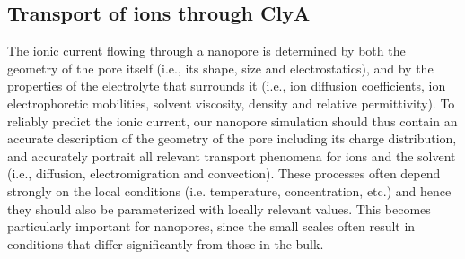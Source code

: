 \documentclass[journal=ancac3, manuscript=article, etalmode=truncate,maxauthors=0]{achemso}
\begin{document}
\subsection{Transport of ions through ClyA}
The ionic current flowing through a nanopore is determined by both the geometry of the pore itself (i.e., its 
shape, size and electrostatics), and by the properties of the electrolyte that surrounds it (i.e., ion 
diffusion coefficients, ion electrophoretic mobilities, solvent viscosity, density and relative 
permittivity). To reliably predict the ionic current, our nanopore simulation should thus contain an 
accurate description of the geometry of the pore including its charge distribution, and accurately portrait 
all relevant transport phenomena for ions and the solvent (i.e., diffusion, electromigration and convection). 
These processes often depend strongly on the local conditions (i.e. temperature, concentration, etc.) and 
hence they should also be parameterized with locally relevant values. This becomes particularly important for 
nanopores, since the small scales often result in conditions that differ significantly from those in the bulk.
\end{document}
